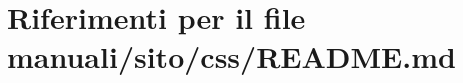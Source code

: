 \hypertarget{manuali_2sito_2css_2README_8md}{}\section{Riferimenti per il file manuali/sito/css/\+R\+E\+A\+D\+ME.md}
\label{manuali_2sito_2css_2README_8md}
